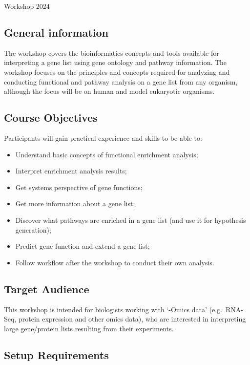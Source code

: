 \documentclass[
]{book}
\providecommand{\tightlist}{%
  \setlength{\itemsep}{0pt}\setlength{\parskip}{0pt}}
\begin{document}
Workshop 2024

\subsection{General information}\label{general-information}

The workshop covers the bioinformatics concepts and tools available for interpreting a gene list using gene ontology and pathway information. The workshop focuses on the principles and concepts required for analyzing and conducting functional and pathway analysis on a gene list from any organism, although the focus will be on human and model eukaryotic organisms.

\subsection{Course Objectives}\label{course-objectives}

Participants will gain practical experience and skills to be able to:

\begin{itemize}
\tightlist
\item
  Understand basic concepts of functional enrichment analysis;
\item
  Interpret enrichment analysis results;
\item
  Get systems perspective of gene functions;
\item
  Get more information about a gene list;
\item
  Discover what pathways are enriched in a gene list (and use it for hypothesis generation);
\item
  Predict gene function and extend a gene list;
\item
  Follow workflow after the workshop to conduct their own analysis.
\end{itemize}

\subsection{Target Audience}\label{target-audience}

This workshop is intended for biologists working with `-Omics data' (e.g.~RNA-Seq, protein expression and other omics data), who are interested in interpreting large gene/protein lists resulting from their experiments.

\subsection{Setup Requirements}\label{setup-requirements}
\end{document}
